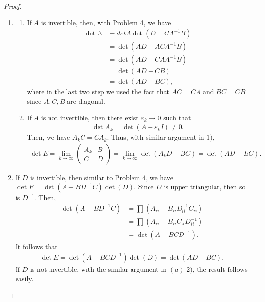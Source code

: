 \documentclass[11pt]{book}
\theoremstyle{definition}
\numberwithin{equation}{chapter}
\begin{document}
\begin{proof}
~\begin{enumerate}[label=(\alph*)]
    \item
    \begin{enumerate}[label=\arabic*)]
        \item If $A$ is invertible, then, with Problem 4, we have 
        \begin{align*}
            \det E & = det A \det \left( D - C A^{-1} B\right) \\
            & = \det \left(AD - A C A^{-1} B\right) \\
            & = \det \left(AD - C A A^{-1} B\right) \\
            & = \det \left(AD - CB\right)\\
            & = \det \left(AD - BC\right),
        \end{align*}
        where in the last two step we used the fact that $AC = CA$ and $BC = CB$ since $A,C,B$ are diagonal.
        \item If $A$ is not invertible, then there exist $\varepsilon_k \to 0$ such that 
        \begin{align*}
            \det A_k = \det (A + \varepsilon_k I) \neq 0.
        \end{align*}
        Then, we have $A_k C = CA_k$. Thus, with similar argument in $1)$, 
        \begin{align*}
            \det E = \lim_{k\to \infty} \begin{pmatrix}
            A_k & B \\
            C & D
        \end{pmatrix} = \lim_{k\to\infty} \det \left(A_k D - BC\right) = \det \left(AD - BC\right).
        \end{align*}
    \end{enumerate}
    
    \item If $D$ is invertible, then similar to Problem 4, we have $\det E = \det (A-BD^{-1}C)\det(D)$. Since $D$ is upper triangular, then so is $D^{-1}$. Then, 
    \begin{align*}
        \det (A-BD^{-1}C) & = \prod \left(A_{ii} - B_{ii} D^{-1}_{ii} C_{ii}\right) \\
        & = \prod \left(A_{ii} - B_{ii} C_{ii} D^{-1}_{ii} \right) \\
        & = \det (A-BCD^{-1}).
    \end{align*}
    It follows that
    \begin{align*}
        \det E = \det (A-BCD^{-1})\det(D) = \det (AD - BC).
    \end{align*}
    If $D$ is not invertible, with the similar argument in $(a)\,\,2)$, the result follows easily.
    

\end{enumerate}
\end{proof}
\end{document}
